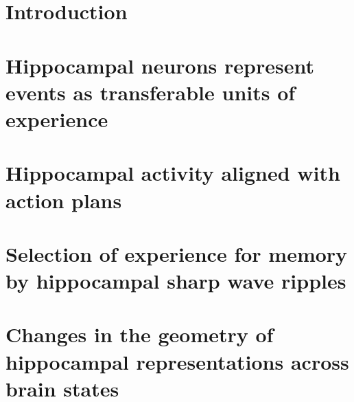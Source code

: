 \documentclass[12pt,oneside,letterpaper]{report}
\begin{document}
\cleardoublepage
{}
{}
\listofappendices
\newpage





\chapter{Introduction} \label{ch_introductory}



\chapter{Hippocampal neurons represent events as transferable units of experience} \label{ch_sun2020}


\chapter{Hippocampal activity aligned with action plans} \label{ch_zutshi2025}


\chapter{Selection of experience for memory by hippocampal sharp wave ripples} \label{ch_selection2024}


\chapter{Changes in the geometry of hippocampal representations across brain states} \label{ch_nreps2023}

\end{document}
